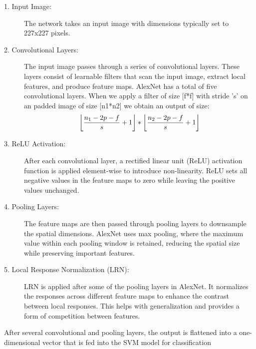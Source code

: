 \begin{description}
\item[1. Input Image:]
The network takes an input image with dimensions typically set to 227x227 pixels.
\item[2. Convolutional Layers:]
The input image passes through a series of convolutional layers. These layers consist of learnable filters that scan the input image, extract local features, and produce feature maps. AlexNet has a total of five convolutional layers.
When we apply a filter of size [f*f] with stride 's' on an padded image of size [n1*n2] we obtain an output of size:\\

\begin{equation}
\Large
\left\lfloor\frac{n_{1}-2p-f}{s}+1\right\rfloor*\left\lfloor\frac{n_{2}-2p-f}{s}+1\right\rfloor
\label{1}
\end{equation}

\item[3. ReLU Activation:]
After each convolutional layer, a rectified linear unit (ReLU) activation function is applied element-wise to introduce non-linearity. ReLU sets all negative values in the feature maps to zero while leaving the positive values unchanged.
\item[4. Pooling Layers:]
The feature maps are then passed through pooling layers to downsample the spatial dimensions. AlexNet uses max pooling, where the maximum value within each pooling window is retained, reducing the spatial size while preserving important features.
\item[5. Local Response Normalization (LRN):]
LRN is applied after some of the pooling layers in AlexNet. It normalizes the responses across different feature maps to enhance the contrast between local responses. This helps with generalization and provides a form of competition between features.
\end{description}
\par 
After several convolutional and pooling layers, the output is flattened into a one-dimensional vector that is fed into the SVM model for classification
